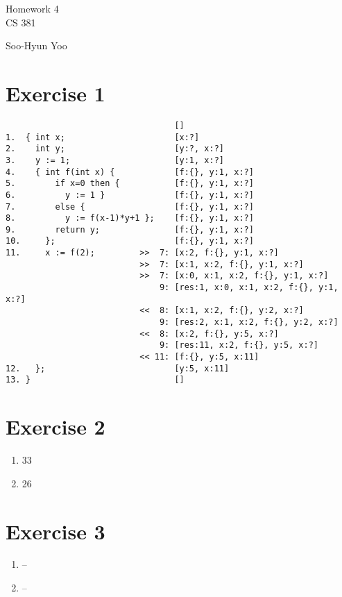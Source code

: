 \documentclass[letterpaper,10pt]{article}
\begin{document}
\begin{titlepage}
	\vspace*{4cm}
	\begin{flushright}
		{\huge
			Homework 4 \\ [1cm]
		}
		{\large
			CS 381 \\ [3cm]
		}

		Soo-Hyun Yoo
	\end{flushright}
\end{titlepage}

\newpage

\section*{Exercise 1}

\begin{verbatim}
                                  []
1.  { int x;                      [x:?]
2.    int y;                      [y:?, x:?]
3.    y := 1;                     [y:1, x:?]
4.    { int f(int x) {            [f:{}, y:1, x:?]
5.        if x=0 then {           [f:{}, y:1, x:?]
6.          y := 1 }              [f:{}, y:1, x:?]
7.        else {                  [f:{}, y:1, x:?]
8.          y := f(x-1)*y+1 };    [f:{}, y:1, x:?]
9.        return y;               [f:{}, y:1, x:?]
10.     };                        [f:{}, y:1, x:?]
11.     x := f(2);         >>  7: [x:2, f:{}, y:1, x:?]
                           >>  7: [x:1, x:2, f:{}, y:1, x:?]
                           >>  7: [x:0, x:1, x:2, f:{}, y:1, x:?]
                               9: [res:1, x:0, x:1, x:2, f:{}, y:1, x:?]
                           <<  8: [x:1, x:2, f:{}, y:2, x:?]
                               9: [res:2, x:1, x:2, f:{}, y:2, x:?]
                           <<  8: [x:2, f:{}, y:5, x:?]
                               9: [res:11, x:2, f:{}, y:5, x:?]
                           << 11: [f:{}, y:5, x:11]
12.   };                          [y:5, x:11]
13. }                             []
\end{verbatim}

\section*{Exercise 2}

\begin{enumerate}
	\item 33
	\item 26
\end{enumerate}

\section*{Exercise 3}

\begin{enumerate}
	\item --
	\item --
\end{enumerate}
\end{document}
